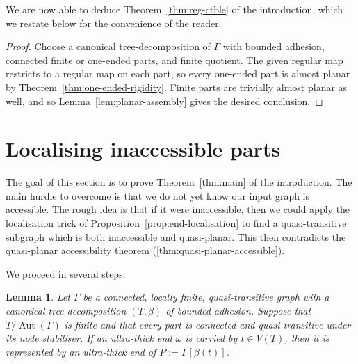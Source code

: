 \documentclass[10pt,a4paper]{amsart}
\newtheorem{lemma}[theorem]{Lemma}
\theoremstyle{definition}
\begin{document}
We are now able to deduce Theorem~\ref{thm:reg-ctble} of the introduction, which we restate below for the convenience of the reader. 

\regctble*

\begin{proof}
Choose a canonical tree-decomposition of $\Gamma$ with bounded adhesion, connected finite or one-ended parts,  and finite quotient.
The given regular map restricts to a regular map on each part, so every one-ended part is almost planar by Theorem~\ref{thm:one-ended-rigidity}.
Finite parts are trivially almost planar as well, and so Lemma~\ref{lem:planar-assembly} gives the desired conclusion.
\end{proof}

\section{Localising inaccessible parts}\label{sec:accessibility}

The goal of this section is to prove Theorem~\ref{thm:main} of the introduction. The main hurdle to overcome is that we do not yet know our input graph is accessible. The rough idea is that if it were inaccessible, then we could apply the localisation trick of Proposition~\ref{prop:end-localisation} to find a quasi-transitive subgraph which is both inaccessible and quasi-planar. This then contradicts the quasi-planar accessibility theorem (\ref{thm:quasi-planar-accessible}). 

We proceed in several steps. 



\begin{lemma}\label{lem:ultra-thick-in-part}
Let $\Gamma$ be a connected, locally finite, quasi-transitive graph with a canonical tree-decomposition $(T,\beta)$ of bounded adhesion.
Suppose that $T/\operatorname{Aut}(\Gamma)$ is finite and that every part is connected and quasi-transitive under its node stabiliser.
If an ultra-thick end $\omega$ is carried by $t\in V(T)$, then it is represented by an ultra-thick end of $P:=\Gamma[\beta(t)]$.
\end{lemma}
\end{document}
